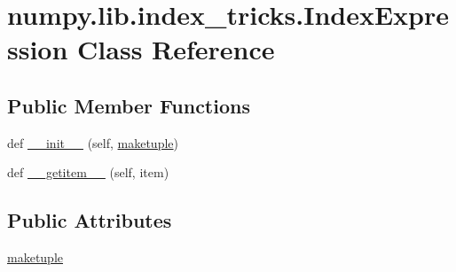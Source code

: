\hypertarget{classnumpy_1_1lib_1_1index__tricks_1_1IndexExpression}{}\section{numpy.\+lib.\+index\+\_\+tricks.\+Index\+Expression Class Reference}
\label{classnumpy_1_1lib_1_1index__tricks_1_1IndexExpression}
\subsection*{Public Member Functions}
\begin{DoxyCompactItemize}
\item 
def \hyperlink{classnumpy_1_1lib_1_1index__tricks_1_1IndexExpression_ab5cc81085a9a92e029f98159c029bc52}{\+\_\+\+\_\+init\+\_\+\+\_\+} (self, \hyperlink{classnumpy_1_1lib_1_1index__tricks_1_1IndexExpression_a9d003fb9d48dcc5f0013423edf89ddf9}{maketuple})
\item 
def \hyperlink{classnumpy_1_1lib_1_1index__tricks_1_1IndexExpression_ad7a537a2fcf446f1161a7b8692e35a5b}{\+\_\+\+\_\+getitem\+\_\+\+\_\+} (self, item)
\end{DoxyCompactItemize}
\subsection*{Public Attributes}
\begin{DoxyCompactItemize}
\item 
\hyperlink{classnumpy_1_1lib_1_1index__tricks_1_1IndexExpression_a9d003fb9d48dcc5f0013423edf89ddf9}{maketuple}
\end{DoxyCompactItemize}


